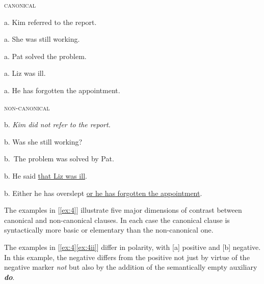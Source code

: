 \begin{examples}\small
\item \label{ex:4}
\noindent\begin{minipage}[t]{0.5\linewidth}
\centering\textsc{canonical}\par\vspace{\smallskipamount}
    \begin{examples}
        \item \label{ex:4i}
            \textnormal{a.} Kim referred to the report.
        \item \label{ex:4ii}
            \textnormal{a.} She was still working.
        \item \label{ex:4iii}
            \textnormal{a.} Pat solved the problem.
        \item \label{ex:4iv}
            \textnormal{a.} Liz was ill.
        \item \label{ex:4v}
            \textnormal{a.} He has forgotten the appointment.
    \end{examples}
\end{minipage}\vspace{-\medskipamount}%
\hspace{2em}%
\begin{minipage}[t]{0.4\linewidth}
{\centering\textsc{non-canonical}\par}\vspace{\smallskipamount}
    b. \itshape Kim did not refer to the report.
    
    \textnormal{b.} Was she still working?
    
    \textnormal{b.}~The problem was solved by Pat.
    
    \textnormal{b.} He said \uline{that Liz was ill}.
    
    \textnormal{b.} Either he has overslept \uline{or he has forgotten the appointment}.
\end{minipage}
\end{examples}
\medskip
{}

\noindent
The examples in [\ref{ex:4}] illustrate five major dimensions of contrast between canonical and non-canonical clauses. In each case the canonical clause is syntactically more basic or elementary than the non-canonical one.

The examples in [\ref{ex:4}\ref{ex:4ii}] differ in {polarity}, with [a] positive and [b] negative. In this example, the negative differs from the positive not just by virtue of the negative marker \textit{not} but also by the addition of the semantically empty auxiliary \textit{\textbf{do}}.

